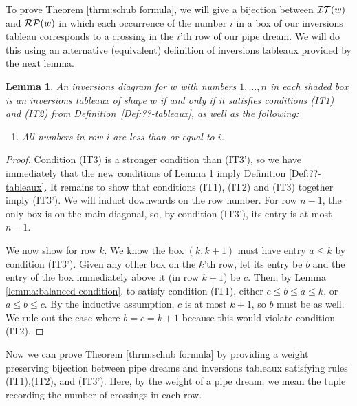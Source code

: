 \documentclass{article}
\newtheorem{lemma}[theorem]{Lemma}
\theoremstyle{definition}
\begin{document}
To prove Theorem \ref{thrm:schub formula}, we will give a bijection between $\mathcal{IT}(w)$ and $\mathcal{RP}(w)$ in which each occurrence of the number $i$ in a box of our inversions tableau corresponds to a crossing in the $i$'th row of our pipe dream. We will do this using an alternative (equivalent) definition of inversions tableaux provided by the next lemma. 

\begin{lemma}\label{lemma:weaker def}
An inversions diagram for $w$ with numbers $1, \dots , n$ in each shaded box is an inversions tableaux of shape $w$ if and only if it satisfies conditions (IT1) and (IT2) from Definition~\ref{Def:??-tableaux}, as well as the following:
\begin{enumerate}
    \item [(IT3')] All numbers in row $i$ are less than or equal to $i$.
\end{enumerate}
\end{lemma}

\begin{proof}
    Condition (IT3) is a stronger condition than (IT3'), so we have immediately that the new conditions of Lemma \ref{lemma:weaker def} imply Definition \ref{Def:??-tableaux}. It remains to show that conditions (IT1), (IT2) and (IT3) together imply (IT3'). We will induct downwards on the row number. For row $n-1$, the only box is on the main diagonal, so, by condition (IT3'), its entry is at most $n-1$. 
    
    We now show for row $k$. We know the box $(k,k+1)$ must have entry $a \leq k$ by condition (IT3'). Given any other box on the $k$'th row, let its entry be $b$ and the entry of the box immediately above it (in row $k+1$) be $c$. Then, by Lemma \ref{lemma:balanced condition}, to satisfy condition (IT1), either $c \leq b \leq a \leq k$, or $a \leq b \leq c$. By the inductive assumption, $c$ is at most $k+1$, so $b$ must be as well. We rule out the case where $b=c=k+1$ because this would violate condition (IT2).
 \end{proof}

Now we can prove Theorem \ref{thrm:schub formula} by providing a weight preserving bijection between pipe dreams and inversions tableaux satisfying rules (IT1),(IT2), and (IT3'). Here, by the weight of a pipe dream, we mean the tuple recording the number of crossings in each row. 
\end{document}
